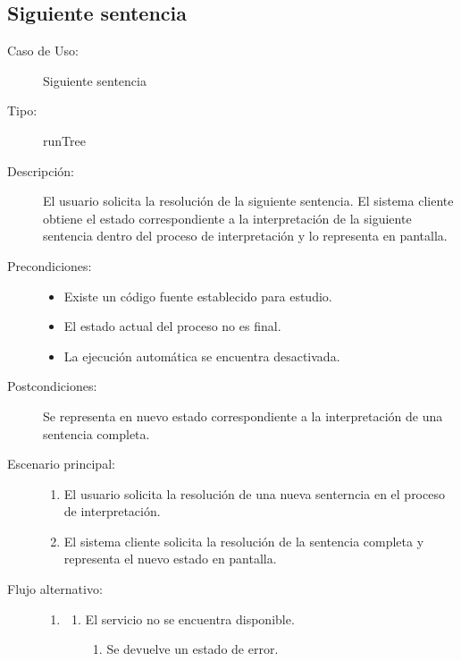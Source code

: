 \subsection{Siguiente sentencia} 
\begin{framed}
\FloatBarrier
\begin{description}
   \item[Caso de Uso:] Siguiente sentencia
   \item [Tipo:] runTree
   \item[Descripción:] 
   El usuario solicita la resolución de la siguiente sentencia. 
   El sistema cliente obtiene el estado correspondiente a la interpretación de la siguiente sentencia 
   dentro del proceso de interpretación y lo representa en pantalla.
  \item[Precondiciones:] \hfill 
   \begin{itemize}
   \item Existe un código fuente establecido para estudio. 
   \item El estado actual del proceso no es final.
   \item La ejecución automática se encuentra desactivada. 
   \end{itemize}
   \item[Postcondiciones:] 
   Se representa en nuevo estado correspondiente a la interpretación de una sentencia completa. 
   \item[Escenario principal:] \hfill
   \begin{enumerate}
   \item El usuario solicita la resolución de una nueva senterncia en el proceso de interpretación.
   \item El sistema cliente solicita la resolución de la sentencia completa y representa
   el nuevo estado en pantalla. 
   \end{enumerate}
   \item[Flujo alternativo:] \hfill 
   \begin{enumerate} \itemsep1pt \parskip0pt 
   \setcounter{enumi}{1}
   \renewcommand{\labelenumi}{}
   \renewcommand{\labelenumiii}{\arabic{enumiii}.}
   \renewcommand{\labelenumii}{\arabic{enumi}\alph{enumii}.}
      \item 
      \begin {enumerate}
         \setcounter{enumii}{0}
         \item El servicio no se encuentra disponible.
         \begin{enumerate}
         \item Se devuelve un estado de error.
         \end{enumerate}
      \end{enumerate}
   \end{enumerate}
\end{description}
 \FloatBarrier
\end{framed}

